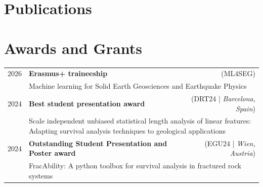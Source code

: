 \documentclass[a4paper,12pt]{article}
\begin{document}
\section{Publications}
\begin{refsection}
\nocite{*}
\printbibliography[heading=none]
\end{refsection}


\section{Awards and Grants}
\begin{tabularx}{\linewidth}{@{}l X r}	
	
	2026 & \textbf{Erasmus+ traineeship} & (ML4SEG) \\
	& \multicolumn{2}{l}{Machine learning for Solid Earth Geosciences and Earthquake Physics}\\
	
	2024 & \textbf{Best student presentation award} & (DRT24 | \textit{Barcelona, Spain})\\
	& \multicolumn{2}{p{0.8\textwidth}}{Scale independent unbiased statistical length analysis of linear features: Adapting survival analysis techniques to geological applications}\\
	
	2024 & \textbf{Outstanding Student Presentation and Poster award} & (EGU24 | \textit{Wien, Austria})\\
	& \multicolumn{2}{p{0.8\textwidth}}{FracAbility: A python toolbox for survival analysis in fractured rock systems}\\	
	
\end{tabularx}
\end{document}
